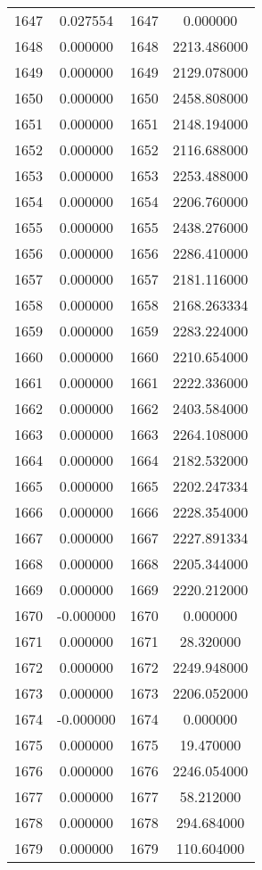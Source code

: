 \documentclass[12pt]{article}
\begin{document}
\begin{longtable}{@{}cccc@{}}
1647 & 0.027554 & 1647 & 0.000000 \\
1648 & 0.000000 & 1648 & 2213.486000 \\
1649 & 0.000000 & 1649 & 2129.078000 \\
1650 & 0.000000 & 1650 & 2458.808000 \\
1651 & 0.000000 & 1651 & 2148.194000 \\
1652 & 0.000000 & 1652 & 2116.688000 \\
1653 & 0.000000 & 1653 & 2253.488000 \\
1654 & 0.000000 & 1654 & 2206.760000 \\
1655 & 0.000000 & 1655 & 2438.276000 \\
1656 & 0.000000 & 1656 & 2286.410000 \\
1657 & 0.000000 & 1657 & 2181.116000 \\
1658 & 0.000000 & 1658 & 2168.263334 \\
1659 & 0.000000 & 1659 & 2283.224000 \\
1660 & 0.000000 & 1660 & 2210.654000 \\
1661 & 0.000000 & 1661 & 2222.336000 \\
1662 & 0.000000 & 1662 & 2403.584000 \\
1663 & 0.000000 & 1663 & 2264.108000 \\
1664 & 0.000000 & 1664 & 2182.532000 \\
1665 & 0.000000 & 1665 & 2202.247334 \\
1666 & 0.000000 & 1666 & 2228.354000 \\
1667 & 0.000000 & 1667 & 2227.891334 \\
1668 & 0.000000 & 1668 & 2205.344000 \\
1669 & 0.000000 & 1669 & 2220.212000 \\
1670 & -0.000000 & 1670 & 0.000000 \\
1671 & 0.000000 & 1671 & 28.320000 \\
1672 & 0.000000 & 1672 & 2249.948000 \\
1673 & 0.000000 & 1673 & 2206.052000 \\
1674 & -0.000000 & 1674 & 0.000000 \\
1675 & 0.000000 & 1675 & 19.470000 \\
1676 & 0.000000 & 1676 & 2246.054000 \\
1677 & 0.000000 & 1677 & 58.212000 \\
1678 & 0.000000 & 1678 & 294.684000 \\
1679 & 0.000000 & 1679 & 110.604000 \\

\end{longtable}
\end{document}

